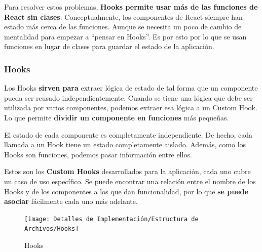 \documentclass[12pt,twoside,titlepage]{report}
\begin{document}
Para resolver estos problemas, \textbf{Hooks permite usar más de las funciones de React sin clases}. Conceptualmente, los componentes de React siempre han estado más cerca de las funciones. Aunque se necesita un poco de cambio de mentalidad para empezar a “pensar en Hooks”. Es por esto por lo que se usan funciones en lugar de clases para guardar el estado de la aplicación.

\subsubsection{Hooks}

Los Hooks \textbf{sirven para} extraer lógica de estado de tal forma que un componente pueda ser reusado independientemente. Cuando se tiene una lógica que debe ser utilizada por varios componentes, podemos extraer esa lógica a un Custom Hook. Lo que permite \textbf{dividir un componente en funciones} más pequeñas.

El estado de cada componente es completamente independiente. De hecho, cada llamada a un Hook tiene un estado completamente aislado. Además, como los Hooks son funciones, podemos pasar información entre ellos.

Estos son los \textbf{Custom Hooks} desarrollados para la aplicación, cada uno cubre un caso de uso específico. Se puede encontrar una relación entre el nombre de los Hooks y de los componentes a los que dan funcionalidad, por lo que \textbf{se puede asociar} fácilmente cada uno más adelante.

\begin{figure}[H]
    \centering
    \texttt{[image: Detalles de Implementación/Estructura de Archivos/Hooks]}
    \label{fig:Hooks}
    \caption{Hooks}
\end{figure}
\end{document}
